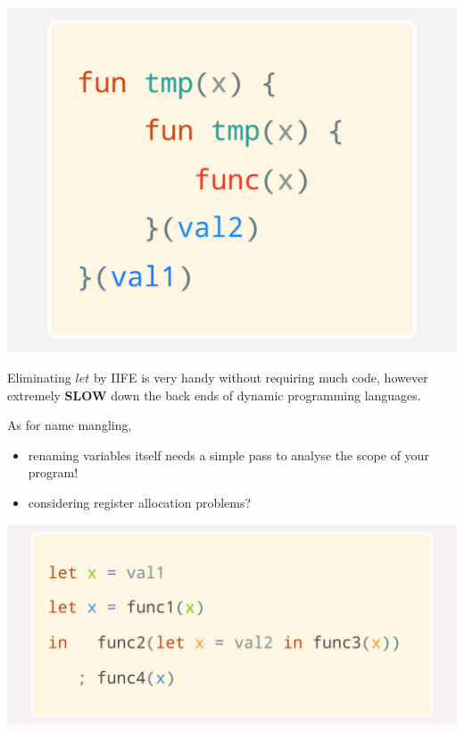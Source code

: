 \documentclass[a1,portrait]{a1poster}
\begin{document}
\begin{multicols}{2}
\begin{multicols}{3}
\begin{minipage}[b]{1\linewidth}
\begin{center}\vspace{1cm}
\includegraphics[width=0.9\linewidth]{figs/let-by-im-call.png}
\end{center}\vspace{1cm}
\end{minipage}

\end{multicols}

 Eliminating $let$ by IIFE is very handy without requiring much code, however
 extremely \textbf{SLOW} down the back ends of dynamic programming languages.

 As for name mangling,

\begin{itemize}
    \item renaming variables itself needs a simple pass to analyse the scope of your program!
    \item considering register allocation problems?
\end{itemize}

\begin{multicols}{2}

\begin{minipage}[b]{1\linewidth}
\begin{center}\vspace{1cm}
    \includegraphics[width=0.9\linewidth]{figs/let-occur.png}
\end{center}\vspace{1cm}
\end{minipage}


\end{multicols}
\end{multicols}
\end{document}

